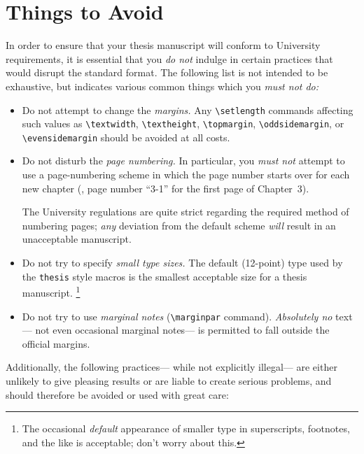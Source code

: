 \section {Things to Avoid}

In order to ensure that your thesis manuscript
will conform to University requirements,
it is essential that you {\em do not\/} indulge in
certain practices that would disrupt the standard format.
The following list is not intended to be exhaustive,
but indicates various common things
which you {\em must not do:}

\begin {itemize}

\item
Do not attempt to change the {\em margins.}
Any \verb+\setlength+ commands affecting such values as
\verb+\textwidth+, \verb+\textheight+, \verb+\topmargin+,
\verb+\oddsidemargin+, or \verb+\evensidemargin+
should be avoided at all costs.

\item
Do not disturb the {\em page numbering.}
In particular, you {\em must not\/} attempt
to use a page-numbering scheme
in which the page number starts over for each new chapter
(\eg, page number ``3-1'' for the first page of Chapter~3).

The University regulations are quite strict
regarding the required method of numbering pages;
{\em any\/} deviation from the default scheme
{\em will\/} result in an unacceptable manuscript.

\item
Do not try to specify {\em small type sizes.}
The default (12-point) type used by the \verb+thesis+ style macros
is the smallest acceptable size for a thesis manuscript.%
\footnote {The occasional {\em default} appearance of smaller type
in superscripts, footnotes, and the like is acceptable;
don't worry about this.}

\item
Do not try to use {\em marginal notes\/}
(\verb+\marginpar+ command).
{\em Absolutely no\/} text---%
not even occasional marginal notes---%
is permitted to fall outside the official margins.

\end {itemize}

Additionally, the following practices---%
while not explicitly illegal---%
are either unlikely to give pleasing results
or are liable to create serious problems,
and should therefore be avoided or used with great care:

